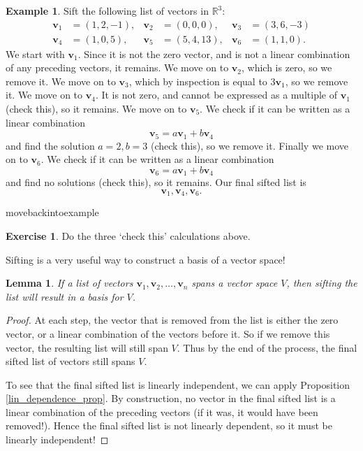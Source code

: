 \documentclass[a4paper,11pt]{book}
\newtheorem{lemma}[theorem]{Lemma}
\theoremstyle{definition}
\newtheorem{exercise}{Exercise}
\newtheorem{example_environment}{Example}[chapter]
\newcommand{\ve}[1]{\mathbf{#1}}
\newenvironment{example}
	{
		\begin{oframed} 
		\begin{example_environment}
	}
	{
		\end{example_environment}
		\end{oframed}
	}
\begin{document}
\begin{example} Sift the following list of vectors in $\mathbb{R}^3$:
\begin{align*}
\ve{v}_1 &= (1,2,-1), & \ve{v}_2 &= (0, 0, 0), & \ve{v}_3 &= (3, 6, -3) \\
\ve{v}_4 &= (1, 0, 5), & \ve{v}_5 &= (5, 4, 13), &  \ve{v}_6 &= (1, 1, 0).
\end{align*}
We start with $\ve{v}_1$. Since it is not the zero vector, and is not a linear combination of any preceding vectors, it remains. We move on to $\ve{v}_2$, which is zero, so we remove it. We move on to $\ve{v}_3$, which by inspection is equal to $3 \ve{v}_1$, so we remove it. We move on to $\ve{v}_4$. It is not zero, and cannot be expressed as a multiple of $\ve{v}_1$ (check this), so it remains. We move on to $\ve{v}_5$. We check if it can be written as a linear combination
\[
 \ve{v}_5 = a\ve{v}_1 + b \ve{v}_4
\] 
and find the solution $a=2, b=3$ (check this), so we remove it. Finally we move on to $\ve{v}_6$. We check if it can be written as a linear combination
\[
 \ve{v}_6 = a\ve{v}_1 + b \ve{v}_4
\] 
and find no solutions (check this), so it remains. Our final sifted list is
\[
 \ve{v}_1, \ve{v}_4, \ve{v}_6.
\]

\end{example}movebackintoexample
\begin{exercise} Do the three `check this' calculations above.
\end{exercise}
Sifting is a very useful way to construct a basis of a vector space!

\begin{lemma} \label{sift_lemma_basis} If a list of vectors $\ve{v}_1, \ve{v}_2, \ldots, \ve{v}_n$ spans a vector space $V$, then sifting the list will result in a basis for $V$.
\end{lemma}
\begin{proof} At each step, the vector that is removed from the list is either the zero vector, or a linear combination of the vectors before it. So if we remove this vector, the resulting list will still span $V$. Thus by the end of the process, the final sifted list of vectors still spans $V$. 

To see that the final sifted list is linearly independent, we can apply Proposition \ref{lin_dependence_prop}. By construction, no vector in the final sifted list is a linear combination of the preceding vectors (if it was, it would have been removed!). Hence the final sifted list is not linearly dependent, so it must be linearly independent!
\end{proof}
\end{document}
